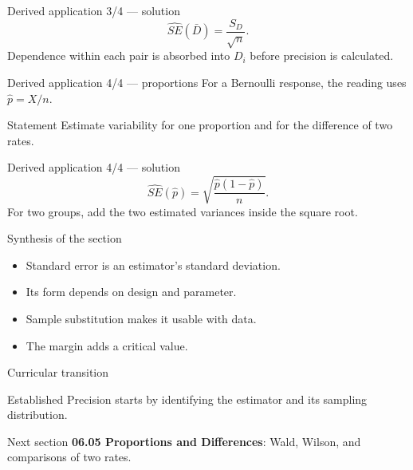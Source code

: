 \documentclass[10pt,aspectratio=169]{beamer}
\begin{document}
\begin{frame}{Derived application 3/4 --- solution}
  \footnotesize
  \[
    \widehat{SE}(\bar D)=\frac{S_D}{\sqrt n}.
  \]
  Dependence within each pair is absorbed into $D_i$ before precision is
  calculated.
\end{frame}

\begin{frame}{Derived application 4/4 --- proportions}
  \footnotesize
  For a Bernoulli response, the reading uses $\hat p=X/n$.
  \begin{block}{Statement}
    Estimate variability for one proportion and for the difference of two rates.
  \end{block}
\end{frame}

\begin{frame}{Derived application 4/4 --- solution}
  \footnotesize
  \[
    \widehat{SE}(\hat p)=\sqrt{\frac{\hat p(1-\hat p)}{n}}.
  \]
  For two groups, add the two estimated variances inside the square root.
\end{frame}

\begin{frame}{Synthesis of the section}
  \footnotesize
  \begin{itemize}\itemsep=0.12cm
    \item Standard error is an estimator's standard deviation.
    \item Its form depends on design and parameter.
    \item Sample substitution makes it usable with data.
    \item The margin adds a critical value.
  \end{itemize}
\end{frame}

\begin{frame}{Curricular transition}
  \footnotesize
  \begin{block}{Established}
    Precision starts by identifying the estimator and its sampling distribution.
  \end{block}
  \begin{alertblock}{Next section}
    \textbf{06.05 Proportions and Differences}: Wald, Wilson, and comparisons of
    two rates.
  \end{alertblock}
\end{frame}
\end{document}
